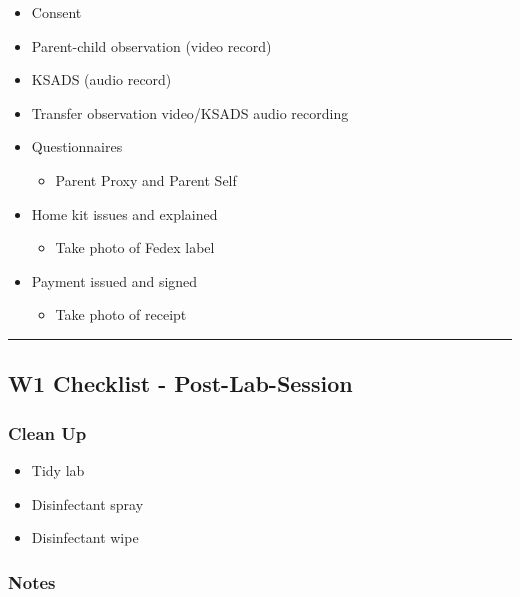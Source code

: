 \documentclass[]{book}
\providecommand{\tightlist}{%
  \setlength{\itemsep}{0pt}\setlength{\parskip}{0pt}}
\begin{document}
\begin{itemize}
\tightlist
\item
  Consent
\item
  Parent-child observation (video record)
\item
  KSADS (audio record)
\item
  Transfer observation video/KSADS audio recording
\item
  Questionnaires

  \begin{itemize}
  \tightlist
  \item
    Parent Proxy and Parent Self
  \end{itemize}
\item
  Home kit issues and explained

  \begin{itemize}
  \tightlist
  \item
    Take photo of Fedex label
  \end{itemize}
\item
  Payment issued and signed

  \begin{itemize}
  \tightlist
  \item
    Take photo of receipt
  \end{itemize}
\end{itemize}

\begin{center}\rule{0.5\linewidth}{0.5pt}\end{center}

\hypertarget{w1-checklist---post-lab-session}{%
\subsection{W1 Checklist - Post-Lab-Session}\label{w1-checklist---post-lab-session}}

\hypertarget{clean-up}{%
\subsubsection{Clean Up}\label{clean-up}}

\begin{itemize}
\tightlist
\item
  Tidy lab
\item
  Disinfectant spray
\item
  Disinfectant wipe
\end{itemize}

\hypertarget{notes}{%
\subsubsection{Notes}\label{notes}}
\end{document}
